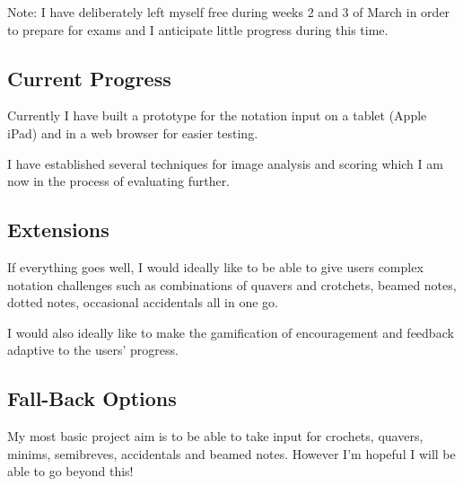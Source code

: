 Note: I have deliberately left myself free during weeks 2 and 3 of March in order to prepare for exams and I anticipate little progress during this time.


\subsection{Current Progress}
Currently I have built a prototype for the notation input on a tablet (Apple iPad) and in a web browser for easier testing.

I have established several techniques for image analysis and scoring which I am now in the process of evaluating further.

\subsection{Extensions}

If everything goes well, I would ideally like to be able to give users complex notation challenges such as combinations of quavers and crotchets, beamed notes, dotted notes, occasional accidentals all in one go.

I would also ideally like to make the gamification of encouragement and feedback adaptive to the users' progress.

\subsection{Fall-Back Options}

My most basic project aim is to be able to take input for crochets, quavers, minims, semibreves, accidentals and beamed notes. However I'm hopeful I will be able to go beyond this!
